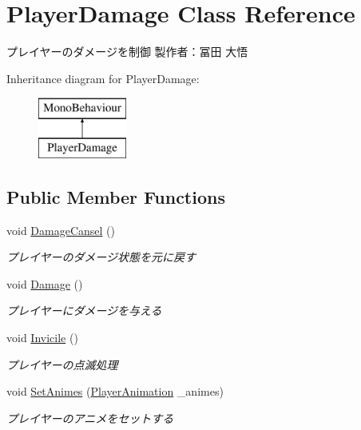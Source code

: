 \hypertarget{class_player_damage}{}\section{Player\+Damage Class Reference}
\label{class_player_damage}


プレイヤーのダメージを制御 製作者：冨田 大悟  


Inheritance diagram for Player\+Damage\+:\begin{figure}[H]
\begin{center}
\leavevmode
\includegraphics[height=2.000000cm]{class_player_damage}
\end{center}
\end{figure}
\subsection*{Public Member Functions}
\begin{DoxyCompactItemize}
\item 
void \hyperlink{class_player_damage_a79eb4af6729d0340caf7725e4121f886}{Damage\+Cansel} ()
\begin{DoxyCompactList}\small\item\em プレイヤーのダメージ状態を元に戻す \end{DoxyCompactList}\item 
void \hyperlink{class_player_damage_ada1f62dd6ab0c1b7888f7154f8bcb2ba}{Damage} ()
\begin{DoxyCompactList}\small\item\em プレイヤーにダメージを与える \end{DoxyCompactList}\item 
void \hyperlink{class_player_damage_a4702eb72b4be3f5bd35861c5ed45a376}{Invicile} ()
\begin{DoxyCompactList}\small\item\em プレイヤーの点滅処理 \end{DoxyCompactList}\item 
void \hyperlink{class_player_damage_a445cc91819e5c5397ac1f992ea9f471b}{Set\+Animes} (\hyperlink{class_player_animation}{Player\+Animation} \+\_\+animes)
\begin{DoxyCompactList}\small\item\em プレイヤーのアニメをセットする \end{DoxyCompactList}\end{DoxyCompactItemize}
